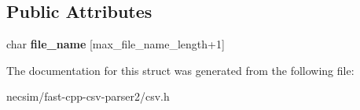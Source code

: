 \subsection*{Public Attributes}
\begin{DoxyCompactItemize}
\item 
char {\bfseries file\+\_\+name} \mbox{[}max\+\_\+file\+\_\+name\+\_\+length+1\mbox{]}\hypertarget{structio_1_1error_1_1with__file__name_ac957d5590a8b95517b74eb5bf373a424}{}\label{structio_1_1error_1_1with__file__name_ac957d5590a8b95517b74eb5bf373a424}

\end{DoxyCompactItemize}


The documentation for this struct was generated from the following file\+:\begin{DoxyCompactItemize}
\item 
necsim/fast-\/cpp-\/csv-\/parser2/csv.\+h\end{DoxyCompactItemize}
